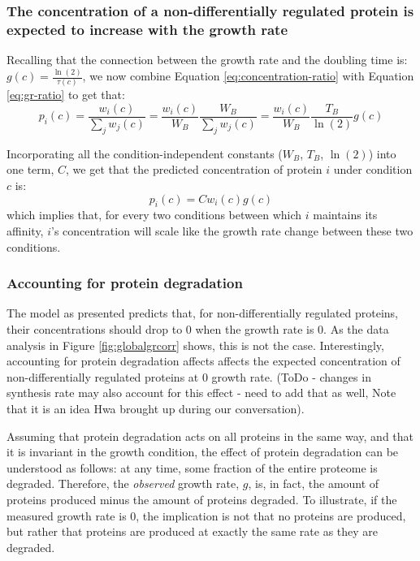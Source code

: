 \documentclass[notitlepage]{article}
\begin{document}
\subsubsection{The concentration of a non-differentially regulated protein is expected to increase with the growth rate} 
Recalling that the connection between the growth rate and the doubling time is: $g(c)=\frac{\ln(2)}{\tau(c)}$, we now combine Equation \ref{eq:concentration-ratio} with Equation \ref{eq:gr-ratio} to get that:
\begin{equation}
  \label{eq:default-response}
  p_i(c)=\frac{w_i(c)}{\sum_jw_j(c)}=\frac{w_i(c)}{W_B}\frac{W_B}{\sum_jw_j(c)}=\frac{w_i(c)}{W_B}\frac{T_B}{\ln(2)}g(c)
\end{equation}

Incorporating all the condition-independent constants ($W_B$, $T_B$, $\ln(2)$) into one term, $C$, we get that the predicted concentration of protein $i$ under condition $c$ is:
\begin{equation}
  \label{eq:final-conc}
  p_i(c)=Cw_i(c)g(c)
\end{equation}
which implies that, for every two conditions between which $i$ maintains its affinity, $i$'s concentration will scale like the growth rate change between these two conditions.

\subsubsection{Accounting for protein degradation}
The model as presented predicts that, for non-differentially regulated proteins, their concentrations should drop to 0 when the growth rate is 0.
As the data analysis in Figure \ref{fig:globalgrcorr} shows, this is not the case.
Interestingly, accounting for protein degradation affects affects the expected concentration of non-differentially regulated proteins at 0 growth rate.
(ToDo - changes in synthesis rate may also account for this effect - need to add that as well, Note that it is an idea Hwa brought up during our conversation).

Assuming that protein degradation acts on all proteins in the same way, and that it is invariant in the growth condition, the effect of protein degradation can be understood as follows: at any time, some fraction of the entire proteome is degraded.
Therefore, the \emph{observed} growth rate, $g$, is, in fact, the amount of proteins produced minus the amount of proteins degraded.
To illustrate, if the measured growth rate is 0, the implication is not that no proteins are produced, but rather that proteins are produced at exactly the same rate as they are degraded.
\end{document}
